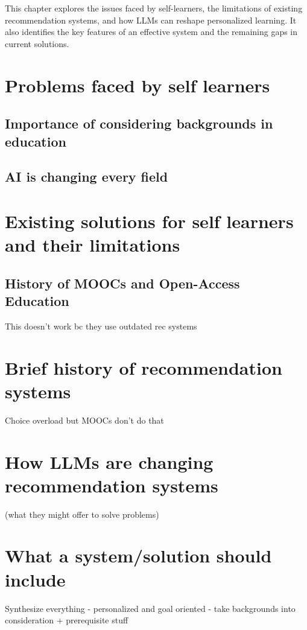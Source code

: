 This chapter explores the issues faced by self-learners, the limitations of existing recommendation systems, and how LLMs can reshape personalized learning. It also identifies the key features of an effective system and the remaining gaps in current solutions.

\section{Problems faced by self learners} 

\subsection{Importance of considering backgrounds in education} 

\subsection{AI is changing every field} 

\section{Existing solutions for self learners and their limitations} 

\subsection{History of MOOCs and Open-Access Education}

This doesn't work bc they use outdated rec systems 

\section{Brief history of recommendation systems}

Choice overload but MOOCs don't do that 

\section{How LLMs are changing recommendation systems}

(what they might offer to solve problems)

\section{What a system/solution should include}

Synthesize everything 
- personalized and goal oriented
- take backgrounds into consideration + prerequisite stuff 
